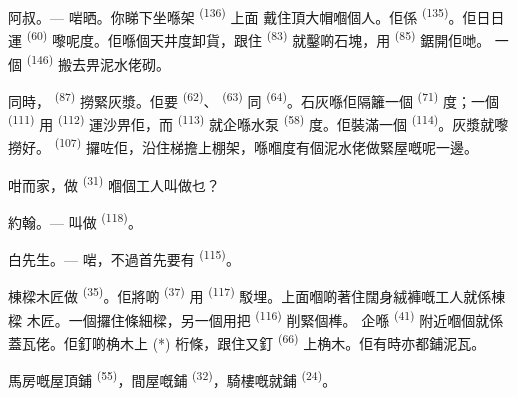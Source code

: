 \textsc{阿叔}。--- 啱晒。你睇下坐喺架 \textsuperscript{(136)} 上面
戴住頂大帽嗰個人。佢係 \textsuperscript{(135)}。佢日日運
\textsuperscript{(60)} 嚟呢度。佢喺個天井度卸貨，跟住
\textsuperscript{(83)} 就鑿啲石塊，用 \textsuperscript{(85)} 鋸開佢哋。
一個 \textsuperscript{(146)} 搬去畀泥水佬砌。

同時， \textsuperscript{(87)} 撈緊灰漿。佢要
\textsuperscript{(62)}、 \textsuperscript{(63)} 同
\textsuperscript{(64)}。石灰喺佢隔籬一個 \textsuperscript{(71)} 度；一個
 \textsuperscript{(111)} 用 \textsuperscript{(112)}
運沙畀佢，而 \textsuperscript{(113)} 就企喺水泵 \textsuperscript{(58)}
度。佢裝滿一個 \textsuperscript{(114)}。灰漿就嚟撈好。
\textsuperscript{(107)} 攞咗佢，沿住梯擔上棚架，喺嗰度有個泥水佬做緊屋嘅呢一邊。

咁而家，做 \textsuperscript{(31)} 嗰個工人叫做乜？

\textsc{約翰}。--- 叫做 \textsuperscript{(118)}。

\VUsaut{3.0mm}
\VUsaut{3.0mm}

\textsc{白先生}。--- 啱，不過首先要有 \textsuperscript{(115)}。

棟樑木匠做 \textsuperscript{(35)}。佢將啲 \textsuperscript{(37)}
用 \textsuperscript{(117)} 駁埋。上面嗰啲著住闊身絨褲嘅工人就係棟樑
木匠。一個攞住條細樑，另一個用把 \textsuperscript{(116)} 削緊個榫。
企喺 \textsuperscript{(41)} 附近嗰個就係蓋瓦佬。佢釘啲桷木上 (*)
桁條，跟住又釘 \textsuperscript{(66)} 上桷木。佢有時亦都鋪泥瓦。


馬房嘅屋頂鋪 \textsuperscript{(55)}，間屋嘅鋪
\textsuperscript{(32)}，騎樓嘅就鋪 \textsuperscript{(24)}。


